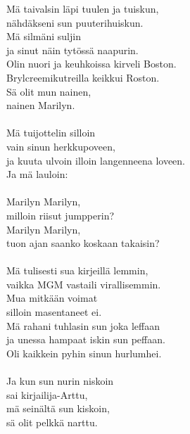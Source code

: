 
        Mä taivalsin läpi tuulen ja tuiskun, \\
        nähdäkseni sun puuterihuiskun. \\
        Mä silmäni suljin \\
        ja sinut näin tytössä naapurin. \\
        Olin nuori ja keuhkoissa kirveli Boston. \\
        Brylcreemikutreilla keikkui Roston. \\
        Sä olit mun nainen, \\
        nainen Marilyn. \\
\hspace{10mm} \\
        Mä tuijottelin silloin \\
        vain sinun herkkupoveen, \\
        ja kuuta ulvoin illoin langenneena loveen. \\
        Ja mä lauloin: \\
\hspace{10mm} \\
        Marilyn Marilyn, \\
        milloin riisut jumpperin? \\
        Marilyn Marilyn, \\
        tuon ajan saanko koskaan takaisin? \\
\hspace{10mm} \\
        Mä tulisesti sua kirjeillä lemmin, \\
        vaikka MGM vastaili virallisemmin. \\
        Mua mitkään voimat \\
        silloin masentaneet ei. \\
        Mä rahani tuhlasin sun joka leffaan \\
        ja unessa hampaat iskin sun peffaan. \\
        Oli kaikkein pyhin sinun hurlumhei. \\
\hspace{10mm} \\
        Ja kun sun nurin niskoin \\
        sai kirjailija-Arttu, \\
        mä seinältä sun kiskoin, \\
        sä olit pelkkä narttu. \\
\hspace{10mm} \\
